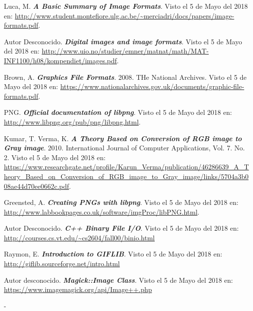\begin{thebibliography}{IEEE}
 Luca, M. \textbf{\textit{A Basic Summary of Image Formats}}.  Visto el 5 de Mayo del 2018 en: \url{http://www.student.montefiore.ulg.ac.be/~merciadri/docs/papers/image-formats.pdf}.

 Autor Desconocido. \textbf{\textit{Digital images and image formats}}. Visto el 5 de Mayo del 2018 en: \url{http://www.uio.no/studier/emner/matnat/math/MAT-INF1100/h08/kompendiet/images.pdf}.

 Brown, A. \textbf{\textit{Graphics File Formats}}. 2008. THe National Archives. Visto el 5 de Mayo del 2018 en: \url{https://www.nationalarchives.gov.uk/documents/graphic-file-formats.pdf}.

 PNG. \textit{\textbf{Official documentation of libpng}}. Visto el 5 de Mayo del 2018 en: \url{http://www.libpng.org/pub/png/libpng.html}. 

 Kumar, T. Verma, K. \textbf{\textit{A Theory Based on Conversion of RGB image to Gray
image}}. 2010. International Journal of Computer Applications, Vol. 7. No. 2. Visto el 5 de Mayo del 2018 en: \url{https://www.researchgate.net/profile/Karun_Verma/publication/46286639_A_Theory_Based_on_Conversion_of_RGB_image_to_Gray_image/links/5704a3b008ae44d70ee0662c.pdf}.

 Greensted, A. \textbf{\textit{Creating PNGs with libpng}}. Visto el 5 de Mayo del 2018 en: \url{http://www.labbookpages.co.uk/software/imgProc/libPNG.html}.

 Autor Desconocido. \textbf{\textit{C++ Binary File I/O}}. Visto el 5 de Mayo del 2018 en: \url{http://courses.cs.vt.edu/~cs2604/fall00/binio.html}

 Raymon, E. \textbf{\textit{Introduction to GIFLIB}}. Visto el 5 de Mayo del 2018 en: \url{http://giflib.sourceforge.net/intro.html}

 Autor desconocido. \textbf{\textit{Magick::Image Class}}. Visto el 5 de Mayo del 2018 en: \url{https://www.imagemagick.org/api/Image++.php}

\end{thebibliography}
-
